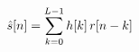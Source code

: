 \documentclass[preview]{standalone}
\begin{document}
\begin{align*}
\special{dvisvgm:raw <g id='unique000'>}\hat s[n]=\sum_{k=0}^{L-1}h[k]\,r[n-k]\special{dvisvgm:raw </g>}
\end{align*}
\end{document}

